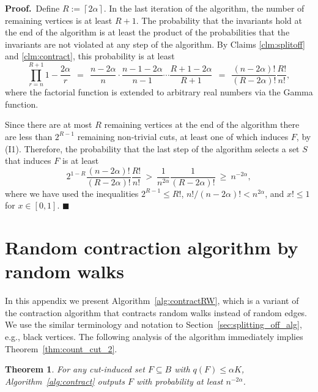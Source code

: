 \documentclass[11pt]{article}
\newcommand{\proofbelow}{8pt}
\numberwithin{equation}{section}
\newtheorem{theorem}{Theorem}[section]
\renewenvironment{proof}{\noindent\textbf{Proof.}\,}{\afterproof}
\newcommand{\afterproof}{\hfill $\blacksquare$ \par \vspace{\proofbelow}}
\newcommand{\ceil}[1]{\left\lceil #1 \right\rceil}
\newcommand{\Algorithm}[1]{Algorithm~\ref{alg:#1}}
\newcommand{\AppendixName}[1]{\label{app:#1}}
\newcommand{\Section}[1]{Section~\ref{sec:#1}}
\newcommand{\TheoremName}[1]{\label{thm:#1}}
\newcommand{\Theorem}[1]{Theorem~\ref{thm:#1}}
\begin{document}
\begin{proof}
Define $R := \ceil{2 \alpha}$.
In the last iteration of the algorithm, the number of remaining vertices is at least $R+1$.
The probability that the invariants hold at the end of the algorithm
is at least the product of the probabilities that the 
invariants are not violated at any step of the algorithm.
By Claims \ref{clm:splitoff} and \ref{clm:contract}, this probability is at least
$$
    \prod_{r=n}^{R+1} 1 - \frac{2 \alpha}{r} 
    ~~=~~ \frac{n-2\alpha}{n} \cdot \frac{n-1 -2\alpha}{n-1} \cdots \frac{R+1 -2\alpha}{R+1} 
    ~~=~~ \frac{(n-2\alpha)!}{(R-2\alpha)!}\frac{R!}{n!},
$$
where the factorial function is extended to arbitrary real numbers via the Gamma function.

Since there are at most $R$ remaining vertices at the end of the algorithm
there are less than $2^{R-1}$ remaining non-trivial cuts,
at least one of which induces $F$, by (I1).
Therefore, the probability that the last step of the algorithm
selects a set $S$ that induces $F$ is at least
$$
    2^{1-R} \frac{(n-2\alpha)!}{(R-2\alpha)!}\frac{R!}{n!}
    ~>~ \frac{1}{n^{2\alpha}} \frac{1}{(R-2\alpha)!}
    ~\ge~ n^{-2\alpha},
$$
where we have used the inequalities $2^{R-1}\le R!$,
$n! / (n-2\alpha)! < n^{2\alpha}$,
and $x! \leq 1$ for $x \in [0,1]$.
\end{proof}





\section{Random contraction algorithm by random walks}
\AppendixName{random_walk_alg}

In this appendix we present \Algorithm{contractRW},
which is a variant of the contraction algorithm that contracts
random walks instead of random edges.
We use the similar terminology and notation to \Section{splitting_off_alg},
e.g., black vertices.
The following analysis of the algorithm immediately implies \Theorem{count_cut_2}.

\begin{theorem}
\TheoremName{contract_with_RW}
For any cut-induced set $F \subseteq B$ with $q(F) \leq \alpha K$,
\Algorithm{contract} outputs $F$ with probability at least $n^{-2\alpha}$.
\end{theorem}
\end{document}
